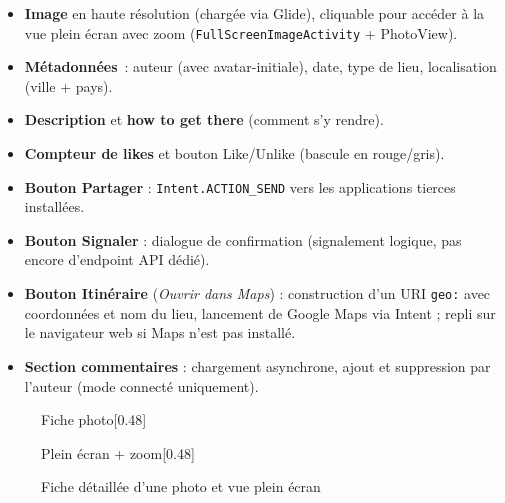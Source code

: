\documentclass[12pt, a4paper]{report}
\begin{document}
\begin{itemize}
  \item \textbf{Image} en haute résolution (chargée via Glide), cliquable pour accéder à
        la vue plein écran avec zoom (\texttt{FullScreenImageActivity} + PhotoView).
  \item \textbf{Métadonnées}~: auteur (avec avatar-initiale), date, type de lieu, localisation
        (ville + pays).
  \item \textbf{Description} et \textbf{how to get there} (comment s'y rendre).
  \item \textbf{Compteur de likes} et bouton Like/Unlike (bascule en rouge/gris).
  \item \textbf{Bouton Partager} : \texttt{Intent.ACTION\_SEND} vers les applications
        tierces installées.
  \item \textbf{Bouton Signaler} : dialogue de confirmation (signalement logique, pas encore
        d'endpoint API dédié).
  \item \textbf{Bouton Itinéraire} (\emph{Ouvrir dans Maps}) : construction d'un URI
        \texttt{geo:} avec coordonnées et nom du lieu, lancement de Google Maps via Intent ;
        repli sur le navigateur web si Maps n'est pas installé.
  \item \textbf{Section commentaires} : chargement asynchrone, ajout et suppression par
        l'auteur (mode connecté uniquement).
\end{itemize}

\begin{figure}[H]
  \centering
  \begin{subcaptionbox}{Fiche photo\label{fig:detail_main}}[0.48\textwidth]
  \end{subcaptionbox}
  \hfill
  \begin{subcaptionbox}{Plein écran + zoom\label{fig:detail_fullscreen}}[0.48\textwidth]
  \end{subcaptionbox}
  \caption{Fiche détaillée d'une photo et vue plein écran}
  \label{fig:photo_detail}
\end{figure}
\end{document}
